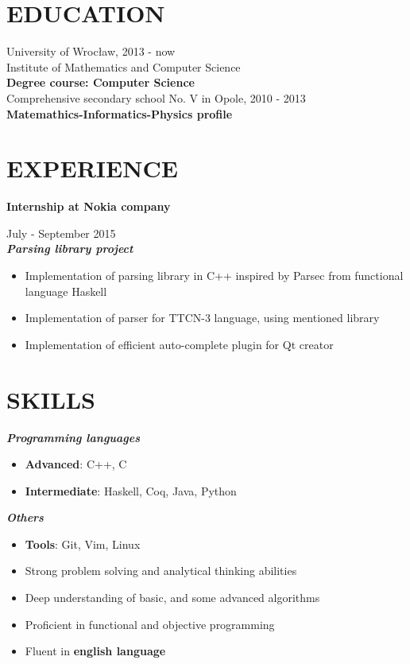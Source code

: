 \documentclass[line,overlapped]{res}
\newcommand{\textbt}[1]{\textit{\textbf{#1}}}
\begin{document}
\address{ Wrocław, przemek.lesniak1@gmail.com, \ tel.: 516 706 214}
 
\begin{resume} 
\section{EDUCATION}

University of Wrocław, 2013 - now \\
Institute of Mathematics and Computer Science \\
\textbf{Degree course: Computer Science} \\

Comprehensive secondary school No. V in Opole, 2010 - 2013 \\
\textbf{Matemathics-Informatics-Physics profile}

\section{EXPERIENCE}
\textbf{Internship at Nokia company} \raggedright July - September 2015 \\
\textbt{Parsing library project} 
\begin{itemize}
	\item{Implementation of parsing library in C++ inspired by Parsec from functional language Haskell }
	\item{Implementation of parser for TTCN-3 language, using mentioned library }
	\item{Implementation of efficient auto-complete plugin for Qt creator } 
\end{itemize}

\section{SKILLS}

\textbt{Programming languages}
\begin{itemize}
	\item{\textbf{Advanced}: C++, C}
	\item{\textbf{Intermediate}: Haskell, Coq, Java, Python }
\end{itemize}
\textbt{Others}
\begin{itemize}
	\item{\textbf{Tools}: Git, Vim, Linux }
	\item{Strong problem solving and analytical thinking abilities }
	\item{Deep understanding of basic, and some advanced algorithms }
	\item{Proficient in functional and objective programming }
	\item{Fluent in \textbf{english language} }
\end{itemize}


\end{resume}
\end{document}

